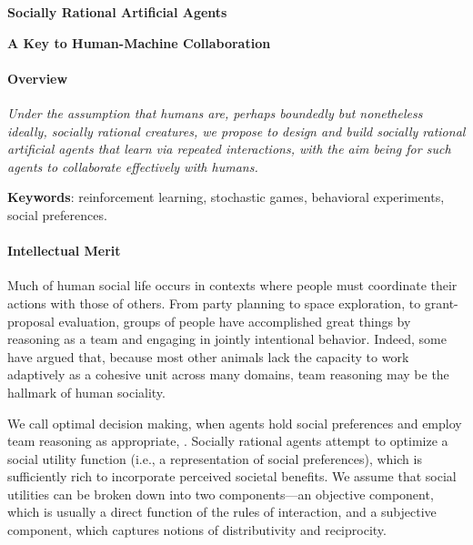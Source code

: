 
\centerline{\Large \bf Socially Rational Artificial Agents}

\vspace{\down}
\centerline{\large \bf A Key to Human-Machine Collaboration}

\vspace{\up}
\paragraph{Overview}

\emph{Under the assumption that humans are, perhaps boundedly
  but nonetheless ideally, socially rational creatures, we propose to
  design and build socially rational artificial agents that learn via
  repeated interactions, with the aim being for such agents to
  collaborate effectively with humans.}



{\bf Keywords}: reinforcement learning, stochastic games, behavioral experiments, social preferences.

\vspace{\up}
\paragraph{Intellectual Merit}

Much of human social life occurs in contexts where people must
coordinate their actions with those of others.  From party planning to
space exploration, to grant-proposal evaluation, groups of people have
accomplished great things by reasoning as a team and engaging in
jointly intentional behavior.  Indeed, some have argued that, because
most other animals lack the capacity to work adaptively as a cohesive
unit across many domains, team reasoning may be the hallmark of human
sociality.

We call optimal decision making, when agents hold social preferences
and employ team reasoning as appropriate, .  
Socially
rational agents attempt to optimize a social utility function (i.e., a
representation of social preferences), which is sufficiently rich to
incorporate perceived societal
benefits.  We assume that social utilities can be broken down into two
components---an objective component, which is usually a direct
function of the rules of interaction, and a subjective component,
which captures notions of distributivity and reciprocity.

